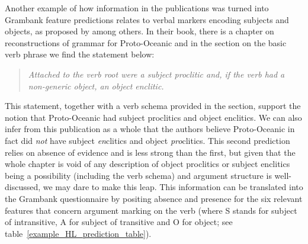 \documentclass[draft,10pt]{article} %
\begin{document}
Another example of how information in the publications was turned into Grambank feature predictions relates to verbal markers encoding subjects and objects, as proposed by \citet{lynchrosscrowley_proto_grammar_oceanic} among others. In their book, there is a chapter on reconstructions of grammar for Proto-Oceanic and in the section on the basic verb phrase we find the statement below:

\begin{quotation}
\noindent\emph{Attached to the verb root were a subject proclitic and, if the verb had a non-generic object, an object enclitic.} \end{quotation} \begin{flushright} \citet[83]{lynchrosscrowley_proto_grammar_oceanic} \end{flushright}

This statement, together with a verb schema provided in the section, support the notion that Proto-Oceanic had subject proclitics and object enclitics. We can also infer from this publication as a whole that the authors believe Proto-Oceanic in fact did \emph{not} have subject \emph{en}clitics and object \emph{pro}clitics. This second prediction relies on absence of evidence and is less strong than the first, but given that the whole chapter is void of any description of object proclitics or subject enclitics being a possibility (including the verb schema) and argument structure is well-discussed, we may dare to make this leap. This information can be translated into the Grambank questionnaire by positing absence and presence for the six relevant features that concern argument marking on the verb (where S stands for subject of intransitive, A for subject of transitive and O for object; see table~\ref{example_HL_prediction_table}).
\end{document}
